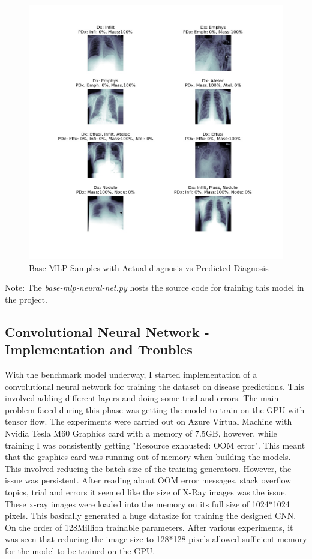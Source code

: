 \documentclass{article}
\begin{document}
    \begin{figure}
        \includegraphics[width=\linewidth]{./images/base-mlp_sample-images-pred-view.jpg}
        \caption{Base MLP Samples with Actual diagnosis vs Predicted Diagnosis}
        \label{fig:base-mlp-pred-samples}
    \end{figure}

    Note: The \textit{base-mlp-neural-net.py} hosts the source code for training this model in the project.\cite{github-proj}

    \subsection{Convolutional Neural Network - Implementation and Troubles}
    With the benchmark model underway, I started implementation of a convolutional neural network for training the dataset on disease predictions. This involved adding different layers and doing some trial and errors. The main problem faced during this phase was getting the model to train on the GPU with tensor flow. The experiments were carried out on Azure Virtual Machine with Nvidia Tesla M60 Graphics card with a memory of 7.5GB, however, while training I was consistently getting "Resource exhausted: OOM error". This meant that the graphics card was running out of memory when building the models. This involved reducing the batch size of the training generators. However, the issue was persistent. After reading about OOM error messages, stack overflow topics, trial and errors it seemed like the size of X-Ray images was the issue. These x-ray images were loaded into the memory on its full size of 1024*1024 pixels. This basically generated a huge datasize for training the designed CNN. On the order of 128Million trainable parameters. After various experiments, it was seen that reducing the image size to 128*128 pixels allowed sufficient memory for the model to be trained on the GPU. 
\end{document}
